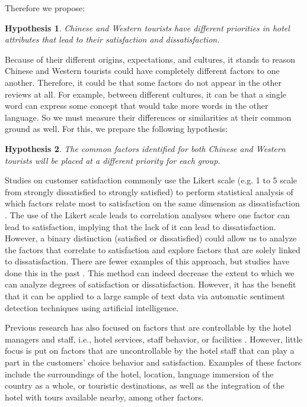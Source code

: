 \documentclass[smallextended,natbib]{svjour3}       %
\makeatletter
\newtheorem{hyp}{Hypothesis}
\newcounter{subhyp}
\newenvironment{subhyp}
   {%
    \setcounter{subhyp}{0}%
    \stepcounter{hyp}%
    \edef\saved@hyp{\thehyp}%
    \let\c@hyp\c@subhyp     %
    \renewcommand{\thehyp}{\saved@hyp\alph{hyp}}%
   }
   {}
\makeatother
\begin{document}
    Therefore we propose:

    \begin{subhyp}
    \begin{hyp}
    \label{hyp:diff_all}
    Chinese and Western tourists have different priorities in hotel attributes that lead to their satisfaction and dissatisfaction.
    \end{hyp}

    Because of their different origins, expectations, and cultures, it stands to reason Chinese and Western tourists could have completely different factors to one another. Therefore, it could be that some factors do not appear in the other reviews at all. For example, between different cultures, it can be that a single word can express some concept that would take more words in the other language. So we must measure their differences or similarities at their common ground as well. For this, we prepare the following hypothesis:

    \begin{hyp}
    \label{hyp:diff_com}
    The common factors identified for both Chinese and Western tourists will be placed at a different priority for each group.
    \end{hyp}
    \end{subhyp}

    Studies on customer satisfaction \cite[e.g.][]{truong2009, romao2014, wu2009} commonly use the Likert scale \cite[][]{likert1932technique} (e.g. 1 to 5 scale from strongly dissatisfied to strongly satisfied) to perform statistical analysis of which factors relate most to satisfaction on the same dimension as dissatisfaction \cite[e.g.][]{chan201518, choi2000}. The use of the Likert scale leads to correlation analyses where one factor can lead to satisfaction, implying that the lack of it can lead to dissatisfaction. However, a binary distinction (satisfied or dissatisfied) could allow us to analyze the factors that correlate to satisfaction and explore factors that are solely linked to dissatisfaction. There are fewer examples of this approach, but studies have done this in the past \cite[e.g.][]{zhou2014}. This method can indeed decrease the extent to which we can analyze degrees of satisfaction or dissatisfaction. However, it has the benefit that it can be applied to a large sample of text data via automatic sentiment detection techniques using artificial intelligence. 

    Previous research has also focused on factors that are controllable by the hotel managers and staff, i.e., hotel services, staff behavior, or facilities \cite[e.g.][]{shanka2004, choi2001}. However, little focus is put on factors that are uncontrollable by the hotel staff that can play a part in the customers' choice behavior and satisfaction. Examples of these factors include the surroundings of the hotel, location, language immersion of the country as a whole, or touristic destinations, as well as the integration of the hotel with tours available nearby, among other factors. 
\end{document}
